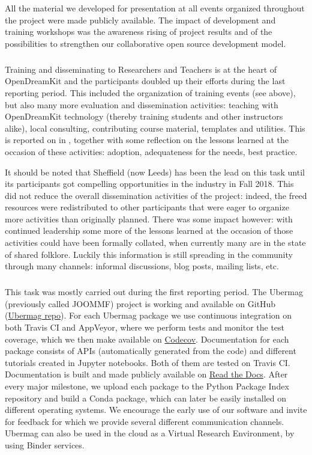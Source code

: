 All the material we developed for presentation at all events organized throughout the project were made publicly available. The impact of development and training workshops was the awareness rising of project results and of the possibilities to strengthen our collaborative open source development model.
\smallskip
\subparagraph{}

Training and disseminating to Researchers and Teachers is at the heart
of OpenDreamKit and the participants doubled up their efforts during
the last reporting period. This included the organization of training
events (see  above), but also many
more evaluation and dissemination activities: teaching with
OpenDreamKit technology (thereby training students and other
instructors alike), local consulting, contributing course material,
templates and utilities. This is reported on in
, together with some reflection on the
lessons learned at the occasion of these activities: adoption,
adequateness for the needs, best practice.

It should be noted that Sheffield (now Leeds) has been the lead on
this task until its participants got compelling opportunities in the
industry in Fall 2018. This did not reduce the overall dissemination
activities of the project: indeed, the freed resources were
redistributed to other participants that were eager to organize more
activities than originally planned. There was some impact however:
with continued leadership some more of the lessons learned at the
occasion of those activities could have been formally collated, when
currently many are in the state of shared folklore. Luckily this
information is still spreading in the community through many channels:
informal discussions, blog posts, mailing lists, etc.

\smallskip
\subparagraph{}
\label{dissem@dissemination-of-oommf-nb-virtual-environment}

This task was mostly carried out during the first reporting period. The Ubermag
(previously called JOOMMF) project is working and available on GitHub
(\href{https://github.com/ubermag}{Ubermag repo}). For each Ubermag
package we use continuous integration on both Travis CI and AppVeyor,
where we perform tests and monitor the test coverage, which we then
make available on \href{https://codecov.io/}{Codecov}. Documentation
for each package consists of APIs (automatically generated from the
code) and different tutorials created in Jupyter notebooks. Both of
them are tested on Travis CI. Documentation is built and made publicly
available on \href{http://discretisedfield.readthedocs.io}{Read the
  Docs}. After every major milestone, we upload each package to the
Python Package Index repository and build a Conda package, which can
later be easily installed on different operating systems. We encourage
the early use of our software and invite for feedback for which we
provide several different communication channels. Ubermag can also be
used in the cloud as a Virtual Research Environment, by using Binder
services.

